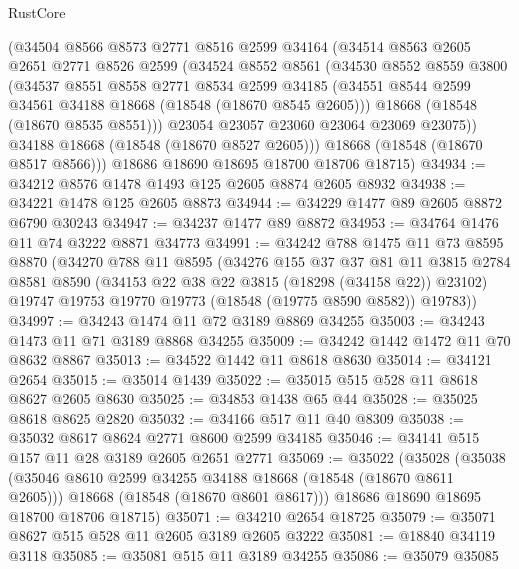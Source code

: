 \begin{lexlean}{RustCore}
\begin{coremodule}
      (@34504
        @8566
        @8573
        @2771
        @8516
        @2599
        @34164
        (@34514
          @8563
          @2605
          @2651
          @2771
          @8526
          @2599
          (@34524
            @8552
            @8561
            (@34530
              @8552
              @8559
              @3800
              (@34537
                @8551
                @8558
                @2771
                @8534
                @2599
                @34185
                (@34551 @8544 @2599 @34561 @34188 @18668 (@18548 (@18670 @8545 @2605)))
                @18668
                (@18548 (@18670 @8535 @8551)))
              @23054
              @23057
              @23060
              @23064
              @23069
              @23075))
          @34188
          @18668
          (@18548 (@18670 @8527 @2605)))
        @18668
        (@18548 (@18670 @8517 @8566)))
      @18686
      @18690
      @18695
      @18700
      @18706
      @18715)
@34934 := @34212 @8576 @1478 @1493 @125 @2605 @8874 @2605 @8932
@34938 := @34221 @1478 @125 @2605 @8873
@34944 := @34229 @1477 @89 @2605 @8872 @6790 @30243
@34947 := @34237 @1477 @89 @8872
@34953 := @34764 @1476 @11 @74 @3222 @8871 @34773
@34991 := @34242
    @788
    @1475
    @11
    @73
    @8595
    @8870
    (@34270
      @788
      @11
      @8595
      (@34276
        @155
        @37
        @37
        @81
        @11
        @3815
        @2784
        @8581
        @8590
        (@34153 @22 @38 @22 @3815 (@18298 (@34158 @22)) @23102)
        @19747
        @19753
        @19770
        @19773
        (@18548 (@19775 @8590 @8582))
        @19783))
@34997 := @34243 @1474 @11 @72 @3189 @8869 @34255
@35003 := @34243 @1473 @11 @71 @3189 @8868 @34255
@35009 := @34242 @1442 @1472 @11 @70 @8632 @8867
@35013 := @34522 @1442 @11 @8618 @8630
@35014 := @34121 @2654
@35015 := @35014 @1439
@35022 := @35015 @515 @528 @11 @8618 @8627 @2605 @8630
@35025 := @34853 @1438 @65 @44
@35028 := @35025 @8618 @8625 @2820
@35032 := @34166 @517 @11 @40 @8309
@35038 := @35032 @8617 @8624 @2771 @8600 @2599 @34185
@35046 := @34141 @515 @157 @11 @28 @3189 @2605 @2651 @2771
@35069 := @35022
    (@35028
      (@35038
        (@35046 @8610 @2599 @34255 @34188 @18668 (@18548 (@18670 @8611 @2605)))
        @18668
        (@18548 (@18670 @8601 @8617)))
      @18686
      @18690
      @18695
      @18700
      @18706
      @18715)
@35071 := @34210 @2654 @18725
@35079 := @35071 @8627 @515 @528 @11 @2605 @3189 @2605 @3222
@35081 := @18840 @34119 @3118
@35085 := @35081 @515 @11 @3189 @34255
@35086 := @35079 @35085

\end{coremodule}
\end{lexlean}
